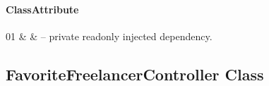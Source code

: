 \paragraph{ClassAttribute}
\begin{ClassAttributeTable}
01 &  &  -- private readonly injected dependency. \\ \hline
\end{ClassAttributeTable}

\subsection{\texorpdfstring{Favorite\allowbreak Freelancer\allowbreak Controller}{FavoriteFreelancerController} Class}
\label{cls:nhuy-FavoriteFreelancerController}

